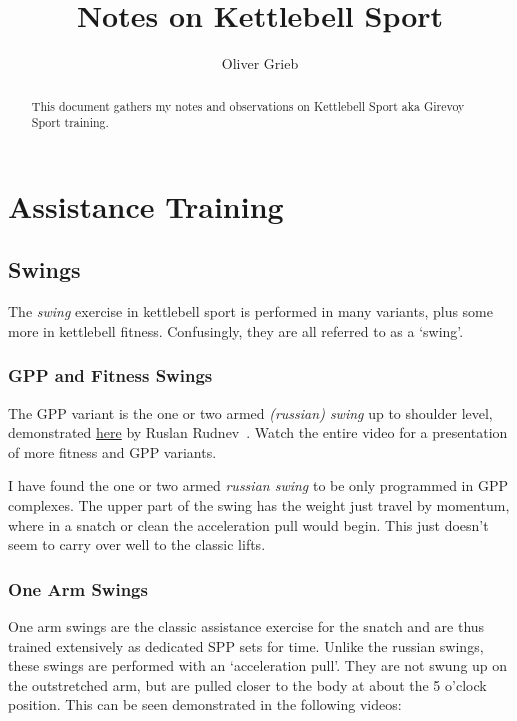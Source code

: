 \documentclass[a4paper,11pt,oneside]{article}
\author{Oliver Grieb}
\title{Notes on Kettlebell Sport}
\begin{document}
\maketitle

\begin{abstract}
This document gathers my notes and observations on Kettlebell Sport aka Girevoy 
Sport training.
\end{abstract}


\section{Assistance Training}


\subsection{Swings}

The \emph{swing} exercise in kettlebell sport is performed in many variants, plus 
some more in kettlebell fitness. Confusingly, they are all referred to as a `swing'.

\subsubsection{GPP and Fitness Swings}

The GPP variant is the one or two armed \emph{(russian) swing} up to shoulder 
level, demonstrated \href{https://youtu.be/T2Sx7qi1TcQ?t=167}{here} 
by Ruslan Rudnev~\cite{rkbyten_swings}. Watch the entire video for a presentation 
of more fitness and GPP variants.

I have found the one or two armed \emph{russian swing} to be only programmed in 
GPP complexes. The upper part of the swing has the weight just travel by momentum, 
where in a snatch or clean the acceleration pull would begin. This just doesn't 
seem to carry over well to the classic lifts.

\subsubsection{One Arm Swings}

One arm swings are the classic assistance exercise for the snatch and are thus 
trained extensively as dedicated SPP sets for time. Unlike the russian swings, 
these swings are performed with an `acceleration pull'. They are not swung up on 
the outstretched arm, but are pulled closer to the body at about the 5 o'clock 
position. This can be seen demonstrated in the following videos:
\end{document}
